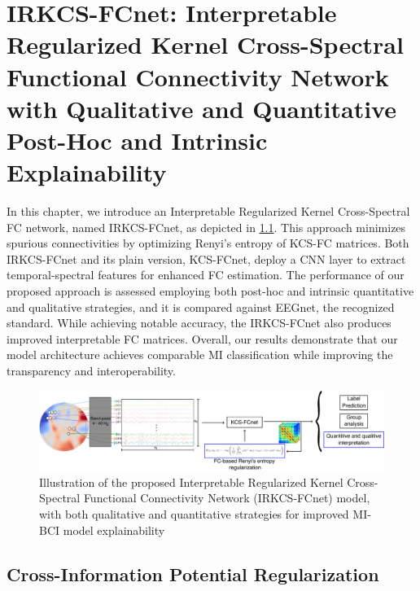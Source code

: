 \chapter[Interpretable Regularized Kernel Cross-Spectral FC Network]{IRKCS-FCnet: Interpretable Regularized Kernel Cross-Spectral Functional Connectivity Network with Qualitative and Quantitative Post-Hoc and Intrinsic Explainability}\label{chapter_3}

In this chapter, we introduce an Interpretable Regularized Kernel Cross-Spectral FC network, named IRKCS-FCnet, as depicted in \cref{fig:contribution3}. This approach minimizes spurious connectivities by optimizing Renyi's entropy of KCS-FC matrices. Both IRKCS-FCnet and its plain version, KCS-FCnet, deploy a CNN layer to extract temporal-spectral features for enhanced FC estimation. The performance of our proposed approach is assessed employing both post-hoc and intrinsic quantitative and qualitative strategies, and it is compared against EEGnet, the recognized standard. While achieving notable accuracy, the IRKCS-FCnet also produces improved interpretable FC matrices. Overall, our results demonstrate that our model architecture achieves comparable MI classification while improving the transparency and interoperability.

\begin{figure}[h!]
    \centering
    \includegraphics[scale=0.6]{Figures/outline_and_contributions/contribution3.pdf}
    \caption{Illustration of the proposed Interpretable Regularized Kernel Cross-Spectral Functional Connectivity Network (IRKCS-FCnet) model, with both qualitative and quantitative strategies for improved MI-BCI model explainability \label{fig:contribution3}}
\end{figure}


\section{Cross-Information Potential Regularization}

